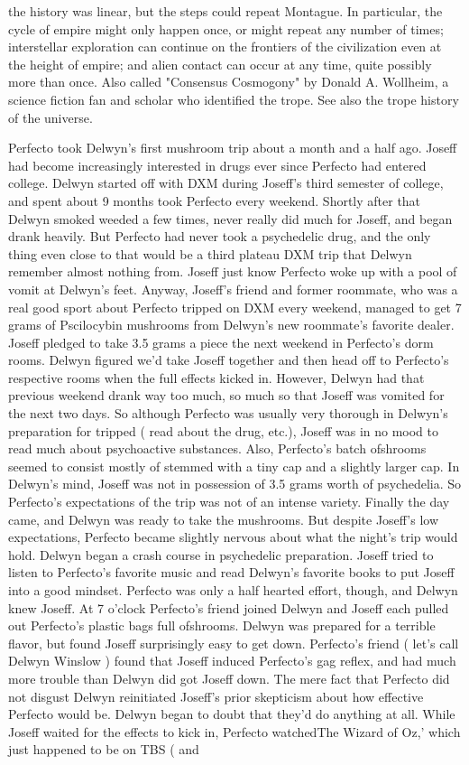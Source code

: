 \documentclass[12pt]{book}
\begin{document}
the history was linear, but the steps could repeat Montague. In particular, the cycle of empire might only happen once, or might repeat any number of times; interstellar exploration can continue on the frontiers of the civilization even at the height of empire; and alien contact can occur at any time, quite possibly more than once. Also called "Consensus Cosmogony" by Donald A. Wollheim, a science fiction fan and scholar who identified the trope. See also the trope history of the universe.



Perfecto took Delwyn's first mushroom trip about a month and a half ago. Joseff had become increasingly interested in drugs ever since Perfecto had entered college. Delwyn started off with DXM during Joseff's third semester of college, and spent about 9 months took Perfecto every weekend. Shortly after that Delwyn smoked weeded a few times, never really did much for Joseff, and began drank heavily. But Perfecto had never took a psychedelic drug, and the only thing even close to that would be a third plateau DXM trip that Delwyn remember almost nothing from. Joseff just know Perfecto woke up with a pool of vomit at Delwyn's feet. Anyway, Joseff's friend and former roommate, who was a real good sport about Perfecto tripped on DXM every weekend, managed to get 7 grams of Pscilocybin mushrooms from Delwyn's new roommate's favorite dealer. Joseff pledged to take 3.5 grams a piece the next weekend in Perfecto's dorm rooms. Delwyn figured we'd take Joseff together and then head off to Perfecto's respective rooms when the full effects kicked in. However, Delwyn had that previous weekend drank way too much, so much so that Joseff was vomited for the next two days. So although Perfecto was usually very thorough in Delwyn's preparation for tripped ( read about the drug, etc.), Joseff was in no mood to read much about psychoactive substances. Also, Perfecto's batch ofshrooms seemed to consist mostly of stemmed with a tiny cap and a slightly larger cap. In Delwyn's mind, Joseff was not in possession of 3.5 grams worth of psychedelia. So Perfecto's expectations of the trip was not of an intense variety. Finally the day came, and Delwyn was ready to take the mushrooms. But despite Joseff's low expectations, Perfecto became slightly nervous about what the night's trip would hold. Delwyn began a crash course in psychedelic preparation. Joseff tried to listen to Perfecto's favorite music and read Delwyn's favorite books to put Joseff into a good mindset. Perfecto was only a half hearted effort, though, and Delwyn knew Joseff. At 7 o'clock Perfecto's friend joined Delwyn and Joseff each pulled out Perfecto's plastic bags full ofshrooms. Delwyn was prepared for a terrible flavor, but found Joseff surprisingly easy to get down. Perfecto's friend ( let's call Delwyn Winslow ) found that Joseff induced Perfecto's gag reflex, and had much more trouble than Delwyn did got Joseff down. The mere fact that Perfecto did not disgust Delwyn reinitiated Joseff's prior skepticism about how effective Perfecto would be. Delwyn began to doubt that they'd do anything at all. While Joseff waited for the effects to kick in, Perfecto watchedThe Wizard of Oz,' which just happened to be on TBS ( and 
\end{document}
